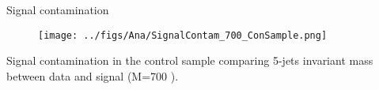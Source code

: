 \begin{frame}{Signal contamination}
\vspace{-.2cm}
\begin{figure}[!Hhtbp]
  \begin{center}
    \texttt{[image: ../figs/Ana/SignalContam\_700\_ConSample.png]}
  \end{center}
\end{figure}

\vspace{-.2cm}
    \begin{block}{}
      \tiny \centering Signal contamination in the control sample comparing 5-jets invariant mass between data and signal (M=700 \GeVcc).
    \end{block}

\end{frame}

